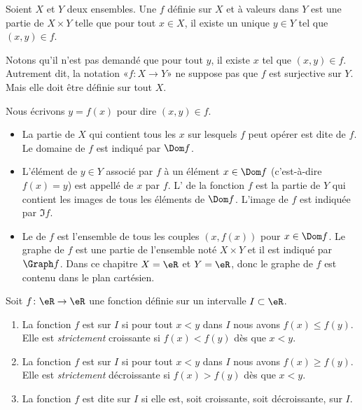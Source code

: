 \begin{definition}
	Soient \( X\) et \( Y\) deux ensembles. Une  \( f\) définie sur \( X\) et à valeurs dans \( Y\) est une partie de \( X\times Y\) telle que pour tout \( x\in X\), il existe un unique \( y\in Y\) tel que \( (x,y)\in f\).
\end{definition}

\begin{normaltext}
	Notons qu'il n'est pas demandé que pour tout \( y\), il existe \( x\) tel que \( (x,y)\in f\). Autrement dit, la notation «\( f\colon X\to Y\)» ne suppose pas que \( f\) est surjective sur \( Y\). Mais elle doit être définie sur tout \( X\).

	Nous écrivons \( y=f(x)\) pour dire \( (x,y)\in f\).
	\begin{itemize}
		\item La partie de \( X\) qui contient tous les \( x\) sur lesquels \( f\) peut opérer est dite  de \( f\). Le domaine de \( f\) est indiqué par \( \Dom f\).
		\item L'élément de \( y\in Y\) associé par \( f\) à un élément \( x\in \Dom f\) (c'est-à-dire \( f(x) = y\))  est appellé  de \( x\) par \( f\). L' de la fonction \( f\) est la partie de \( Y\) qui contient les images de tous les éléments de \( \Dom f\). L'image de \( f\) est indiquée par \( \Im f\).
		\item Le  de \( f\) est l'ensemble de tous les couples \( (x, f(x))\) pour \( x\in \Dom f\). Le graphe de \( f\) est une partie de l'ensemble noté \( X\times Y\) et il est indiqué par \( \Graph f\). Dans ce chapitre \( X = \eR\) et \( Y = \eR\), donc le graphe de \( f\) est contenu dans le plan cartésien.
	\end{itemize}

\end{normaltext}

\begin{definition}
	Soit \( f\colon \eR\to \eR\) une fonction définie sur un intervalle \( I\subset \eR\).
	\begin{enumerate}
		\item
		      La fonction \( f\) est  sur \( I\) si pour tout \( x<y\) dans \( I\) nous avons \( f(x)\leq f(y)\). Elle est \emph{strictement} croissante si \( f(x)<f(y)\) dès que \( x<y\).
		\item
		      La fonction \( f\) est  sur \( I\) si pour tout \( x<y\) dans \( I\) nous avons \( f(x)\geq f(y)\). Elle est \emph{strictement} décroissante si \( f(x)>f(y)\) dès que \( x<y\).
		\item
		      La fonction \( f\) est dite  sur \( I\) si elle est, soit croissante, soit décroissante, sur \( I\).
	\end{enumerate}
\end{definition}

